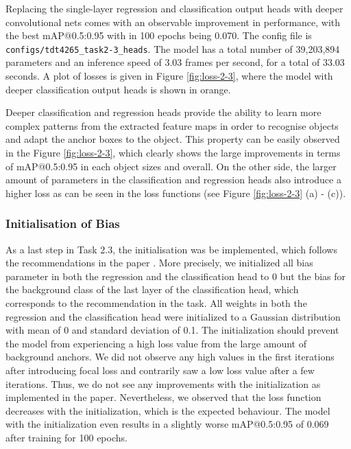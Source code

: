 \documentclass{article}
\begin{document}
Replacing the single-layer regression and classification output heads with deeper convolutional nets comes with an observable improvement in performance, with the best mAP@0.5:0.95 with in 100 epochs being 0.070. The config file is \texttt{configs/tdt4265\_task2-3\_heads}. The model has a total number of 39,203,894 parameters and an inference speed of 3.03 frames per second, for a total of 33.03 seconds. A plot of losses is given in Figure \ref{fig:loss-2-3}, where the model with deeper classification output heads is shown in orange.

Deeper classification and regression heads provide the ability to learn more complex patterns from the extracted feature maps in order to recognise objects and adapt the anchor boxes to the object. This property can be easily observed in the Figure \ref{fig:loss-2-3}, which clearly shows the large improvements in terms of mAP@0.5:0.95 in each object sizes and overall. On the other side, the larger amount of parameters in the classification and regression heads also introduce a higher loss as can be seen in the loss functions (see Figure \ref{fig:loss-2-3} (a) - (c)).

\subsubsection*{Initialisation of Bias}

As a last step in Task 2.3, the initialisation was be implemented, which follows the recommendations in the paper \cite{lin2017focal}. More precisely, we initialized all bias parameter in both the regression and the classification head to 0 but the bias for the background class of the last layer of the classification head, which corresponds to the recommendation in the task. All weights in both the regression and the classification head were initialized to a Gaussian distribution with mean of 0 and standard deviation of 0.1. The initialization should prevent the model from experiencing a high loss value from the large amount of background anchors. We did not observe any high values in the first iterations after introducing focal loss and contrarily saw a low loss value after a few iterations. Thus, we do not see any improvements with the initialization as implemented in the paper. Nevertheless, we observed that the loss function decreases with the initialization, which is the expected behaviour. The model with the initialization even results in a slightly worse mAP@0.5:0.95 of 0.069 after training for 100 epochs.
\end{document}
